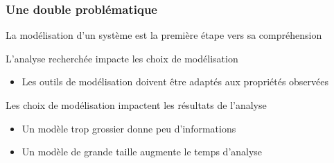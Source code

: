 
\begin{frame}[c]
  \frametitle{Une double problématique}

La modélisation d'un système est la première étape vers sa compréhension

\begin{center}
\end{center}

\pause[2]
L'analyse recherchée impacte les choix de modélisation
\begin{itemize}
  \item Les outils de modélisation doivent être adaptés aux propriétés observées
\end{itemize}

\pause[3]
\medskip
Les choix de modélisation impactent les résultats de l'analyse
\begin{itemize}
  \item Un modèle trop grossier donne peu d'informations
  \item Un modèle de grande taille augmente le temps d'analyse
\end{itemize}

\pause[4]
\medskip
\begin{center}
\end{center}

\end{frame}



